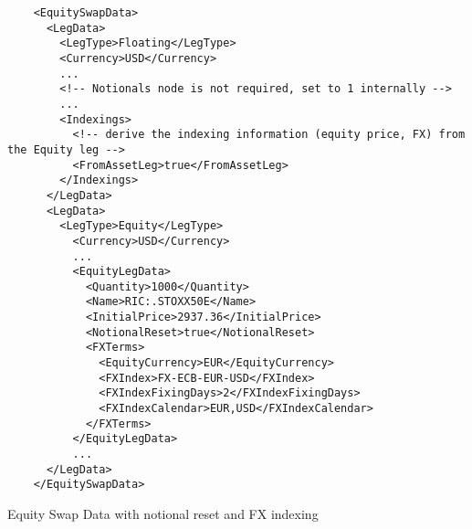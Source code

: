 \begin{listing}[H]
\begin{verbatim}
    <EquitySwapData>
      <LegData>
        <LegType>Floating</LegType>
        <Currency>USD</Currency>
        ...
        <!-- Notionals node is not required, set to 1 internally -->
        ...
        <Indexings>
          <!-- derive the indexing information (equity price, FX) from the Equity leg -->
          <FromAssetLeg>true</FromAssetLeg>
        </Indexings>
      </LegData>
      <LegData>
        <LegType>Equity</LegType>
          <Currency>USD</Currency>
          ...
          <EquityLegData>
            <Quantity>1000</Quantity>
            <Name>RIC:.STOXX50E</Name>
            <InitialPrice>2937.36</InitialPrice>
            <NotionalReset>true</NotionalReset>
            <FXTerms>
              <EquityCurrency>EUR</EquityCurrency>
              <FXIndex>FX-ECB-EUR-USD</FXIndex>
              <FXIndexFixingDays>2</FXIndexFixingDays>
              <FXIndexCalendar>EUR,USD</FXIndexCalendar>
            </FXTerms>
          </EquityLegData>
          ...
      </LegData>
    </EquitySwapData>
\end{verbatim}
\caption{Equity Swap Data with notional reset and FX indexing}
\label{lst:equityswap_reset}
\end{listing}
